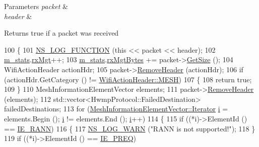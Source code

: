 \begin{DoxyParams}{Parameters}
{\em packet} & \\
\hline
{\em header} & \\
\hline
\end{DoxyParams}
\begin{DoxyReturn}{Returns}
true if a packet was received 
\end{DoxyReturn}

\begin{DoxyCode}
100 \{
101   \hyperlink{log-macros-disabled_8h_a90b90d5bad1f39cb1b64923ea94c0761}{NS\_LOG\_FUNCTION} (\textcolor{keyword}{this} << packet << header);
102   \hyperlink{classns3_1_1dot11s_1_1HwmpProtocolMac_a72bb14d6985cc79bef9ac33fdcdb0a00}{m\_stats}.\hyperlink{structns3_1_1dot11s_1_1HwmpProtocolMac_1_1Statistics_a2cc31314569586538efb043e29f0f8b6}{rxMgt}++;
103   \hyperlink{classns3_1_1dot11s_1_1HwmpProtocolMac_a72bb14d6985cc79bef9ac33fdcdb0a00}{m\_stats}.\hyperlink{structns3_1_1dot11s_1_1HwmpProtocolMac_1_1Statistics_abb4985a260d7a4c4442168ca98c79dec}{rxMgtBytes} += packet->\hyperlink{classns3_1_1Packet_a462855c9929954d4301a4edfe55f4f1c}{GetSize} ();
104   WifiActionHeader actionHdr;
105   packet->\hyperlink{classns3_1_1Packet_a0961eccf975d75f902d40956c93ba63e}{RemoveHeader} (actionHdr);
106   \textcolor{keywordflow}{if} (actionHdr.GetCategory () != \hyperlink{classns3_1_1WifiActionHeader_a5402becd11b4077f22d76c4d0d923358a2324e47740ec462176e2b3dbbf50fc59}{WifiActionHeader::MESH})
107     \{
108       \textcolor{keywordflow}{return} \textcolor{keyword}{true};
109     \}
110   MeshInformationElementVector elements;
111   packet->\hyperlink{classns3_1_1Packet_a0961eccf975d75f902d40956c93ba63e}{RemoveHeader} (elements);
112   std::vector<HwmpProtocol::FailedDestination> failedDestinations;
113   \textcolor{keywordflow}{for} (\hyperlink{classns3_1_1WifiInformationElementVector_a19429192ca24ca8c4c51fe1f998e0a2f}{MeshInformationElementVector::Iterator} 
      \hyperlink{bernuolliDistribution_8m_a6f6ccfcf58b31cb6412107d9d5281426}{i} = elements.Begin (); \hyperlink{bernuolliDistribution_8m_a6f6ccfcf58b31cb6412107d9d5281426}{i} != elements.End (); \hyperlink{bernuolliDistribution_8m_a6f6ccfcf58b31cb6412107d9d5281426}{i}++)
114     \{
115       \textcolor{keywordflow}{if} ((*i)->ElementId () == \hyperlink{wifi-information-element_8h_a46d8a8db46e528387990a68896ea024a}{IE\_RANN})
116         \{
117           \hyperlink{group__logging_gade7208b4009cdf0e25783cd26766f559}{NS\_LOG\_WARN} (\textcolor{stringliteral}{"RANN is not supported!"});
118         \}
119       \textcolor{keywordflow}{if} ((*i)->ElementId () == \hyperlink{wifi-information-element_8h_a2d91556437a285af73b9cdfcc30ebbea}{IE\_PREQ})

\end{DoxyCode}
